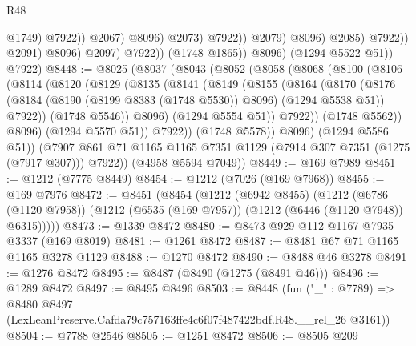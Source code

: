 \begin{lexlean}{R48}
\begin{coremodule}
                                                @1749)
                                              @7922))
                                          @2067)
                                        @8096)
                                      @2073)
                                    @7922))
                                @2079)
                              @8096)
                            @2085)
                          @7922))
                      @2091)
                    @8096)
                  @2097)
                @7922))
            (@1748 @1865))
          @8096)
        (@1294 @5522 @51))
      @7922)
@8448 := @8025
    (@8037
      (@8043
        (@8052
          (@8058
            (@8068
              (@8100
                (@8106
                  (@8114
                    (@8120
                      (@8129
                        (@8135
                          (@8141
                            (@8149
                              (@8155
                                (@8164
                                  (@8170
                                    (@8176
                                      (@8184
                                        (@8190 (@8199 @8383 (@1748 @5530)) @8096)
                                        (@1294 @5538 @51))
                                      @7922))
                                  (@1748 @5546))
                                @8096)
                              (@1294 @5554 @51))
                            @7922))
                        (@1748 @5562))
                      @8096)
                    (@1294 @5570 @51))
                  @7922))
              (@1748 @5578))
            @8096)
          (@1294 @5586 @51))
        (@7907 @861 @71 @1165 @1165 @7351 @1129 (@7914 @307 @7351 (@1275 (@7917 @307))) @7922))
      (@4958 @5594 @7049))
@8449 := @169 @7989
@8451 := @1212 (@7775 @8449)
@8454 := @1212 (@7026 (@169 @7968))
@8455 := @169 @7976
@8472 := @8451
    (@8454
      (@1212
        (@6942 @8455)
        (@1212
          (@6786 (@1120 @7958))
          (@1212 (@6535 (@169 @7957)) (@1212 (@6446 (@1120 @7948)) @6315)))))
@8473 := @1339 @8472
@8480 := @8473 @929 @112 @1167 @7935 @3337 (@169 @8019)
@8481 := @1261 @8472
@8487 := @8481 @67 @71 @1165 @1165 @3278 @1129
@8488 := @1270 @8472
@8490 := @8488 @46 @3278
@8491 := @1276 @8472
@8495 := @8487 (@8490 (@1275 (@8491 @46)))
@8496 := @1289 @8472
@8497 := @8495 @8496
@8503 := @8448
    (fun ("_" : @7789) =>
    @8480 @8497 (LexLeanPreserve.Cafda79c757163ffe4c6f07f487422bdf.R48.__rel_26 @3161))
@8504 := @7788 @2546
@8505 := @1251 @8472
@8506 := @8505 @209

\end{coremodule}
\end{lexlean}
